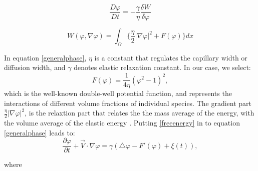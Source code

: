 \documentclass[letterpaper,10pt]{article}
\begin{document}
\begin{equation}
 \label{generalphase}
\frac{D \varphi }{D t} = - \frac{\gamma}{\eta} \frac{\delta W} {\delta \varphi} 
\end{equation}

\begin{equation}
 \label{ginzlandu}
 W(\varphi,\nabla \varphi) = \int_\Omega \lbrace\frac{\eta}{2} |\nabla \varphi|^2 + F(\varphi) \rbrace dx
\end{equation}

In equation \eqref{generalphase}, $ \eta $ is a constant that regulates the capillary width or diffusion width, and $ \gamma $ denotes elastic relaxation constant. In our case, we select:
\begin{equation}
 \label{freeenergy}
  F(\varphi)=\frac{1}{4\eta} (\varphi^2-1)^2 ,
  \end{equation}
which is the well-known double-well potential function, and represents the interactions of different volume fractions of individual species. The gradient part $ \frac{\eta}{2} |\nabla \varphi|^2  $, is the relaxtion part that relates the the mass average of the energy, with the volume average of the elastic energy \cite{Bronsard1990,Larson1999}.
Putting \eqref{freeenergy} in to equation \eqref{generalphase} leads to: 
\begin{equation} 
\label{allencahn}
\frac{\partial \varphi }{\partial t} + \overrightarrow{V}\cdot \nabla \varphi = 
\gamma (\bigtriangleup\varphi -F'(\varphi)+\xi(t)),
\end{equation}

where
\end{document}
